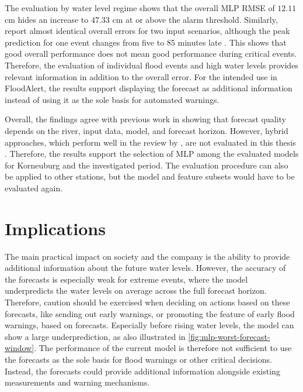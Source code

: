 The evaluation by water level regime shows that the overall \ac{MLP} \ac{RMSE} of $12.11$ cm hides an increase to $47.33$ cm at or above the alarm threshold. Similarly, \citeauthor{sandersDataDrivenFloodAlert2022} report almost identical overall errors for two input scenarios, although the peak prediction for one event changes from five to 85 minutes late \cite{sandersDataDrivenFloodAlert2022}. This shows that good overall performance does not mean good performance during critical events. Therefore, the evaluation of individual flood events and high water levels provides relevant information in addition to the overall error. For the intended use in FloodAlert, the results support displaying the forecast as additional information instead of using it as the sole basis for automated warnings.

Overall, the findings agree with previous work in showing that forecast quality depends on the river, input data, model, and forecast horizon. However, hybrid approaches, which perform well in the review by \citeauthor{asifReviewIntercomparisonMachine2025}, are not evaluated in this thesis \cite{asifReviewIntercomparisonMachine2025}. Therefore, the results support the selection of \ac{MLP} among the evaluated models for Korneuburg and the investigated period. The evaluation procedure can also be applied to other stations, but the model and feature subsets would have to be evaluated again.



\section{Implications}
The main practical impact on society and the company is the ability to provide additional information about the future water levels. However, the accuracy of the forecasts is especially weak for extreme events, where the model underpredicts the water levels on average across the full forecast horizon. Therefore, caution should be exercised when deciding on actions based on these forecasts, like sending out early warnings, or promoting the feature of early flood warnings, based on forecasts. Especially before rising water levels, the model can show a large underprediction, as also illustrated in \autoref{fig:mlp-worst-forecast-window}. The performance of the current model is therefore not sufficient to use the forecasts as the sole basis for flood warnings or other critical decisions. Instead, the forecasts could provide additional information alongside existing measurements and warning mechanisms.

